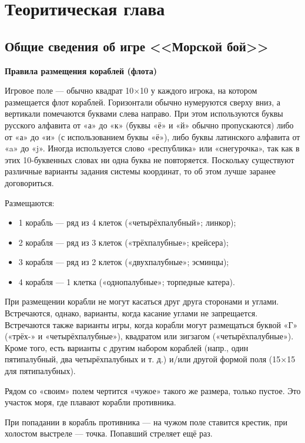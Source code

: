 \chapter{\label{ch:ch01}Теоритическая глава} %
\section{\label{sec:ch01/sec01}Общие сведения об игре <<Морской бой>>}
\textbf{Правила размещения кораблей (флота)}~\cite{p5}

Игровое поле — обычно квадрат 10×10 у каждого игрока, на котором размещается флот кораблей. Горизонтали обычно нумеруются сверху вниз, а вертикали помечаются буквами слева направо. При этом используются буквы русского алфавита от «а» до «к» (буквы «ё» и «й» обычно пропускаются) либо от «а» до «и» (с использованием буквы «ё»), либо буквы латинского алфавита от «a» до «j». Иногда используется слово «республика» или «снегурочка», так как в этих 10-буквенных словах ни одна буква не повторяется. Поскольку существуют различные варианты задания системы координат, то об этом лучше заранее договориться.

Размещаются:
\begin{itemize}
\item 1 корабль — ряд из 4 клеток («четырёхпалубный»; линкор);
\item 2 корабля — ряд из 3 клеток («трёхпалубные»; крейсера);
\item 3 корабля — ряд из 2 клеток («двухпалубные»; эсминцы);
\item 4 корабля — 1 клетка («однопалубные»; торпедные катера).
\end{itemize}

При размещении корабли не могут касаться друг друга сторонами и углами. Встречаются, однако, варианты, когда касание углами не запрещается. Встречаются также варианты игры, когда корабли могут размещаться буквой «Г» («трёх-» и «четырёхпалубные»), квадратом или зигзагом («четырёхпалубные»). Кроме того, есть варианты с другим набором кораблей (напр., один пятипалубный, два четырёхпалубных и т. д.) и/или другой формой поля (15×15 для пятипалубных).

Рядом со «своим» полем чертится «чужое» такого же размера, только пустое. Это участок моря, где плавают корабли противника.

При попадании в корабль противника — на чужом поле ставится крестик, при холостом выстреле — точка. Попавший стреляет ещё раз.

